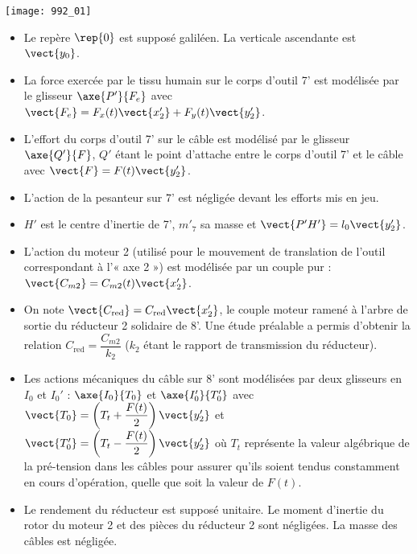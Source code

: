 \begin{center}
\texttt{[image: 992\_01]}
\end{center}

\begin{itemize}
\item Le repère $\rep{0}$ est supposé galiléen. La verticale ascendante est $\vect{y_0}$.
\item La force exercée par le tissu humain sur le corps d’outil 7’ est modélisée par le glisseur $\axe{P'}{F_e}$
avec $\vect{F_e}=F_x(t)\vect{x_2'}+F_y(t)\vect{y_2'}$.
\item L’effort du corps d’outil 7’ sur le câble est modélisé par le glisseur $\axe{Q'}{F}$, $Q'$ étant le point
d’attache entre le corps d’outil 7’ et le câble avec $\vect{F}=F(t)\vect{y_2'}$.
\item L’action de la pesanteur sur 7’ est négligée devant les efforts mis en jeu.
\item $H'$ est le centre d’inertie de 7’, $m'_7$ sa masse et $\vect{P'H'}=l_0\vect{y_2'}$.
\item L’action du moteur 2 (utilisé pour le mouvement de translation de l’outil correspondant à l’« axe 2 ») est
modélisée par un couple pur : $\vect{C_{m2}}=C_{m2}(t)\vect{x_2'}$.
\item On note  $\vect{C_{\text{red}}}=C_{\text{red}}\vect{x_2'}$, le couple moteur ramené à l’arbre de sortie du réducteur 2 solidaire de 8’. Une étude préalable a permis d’obtenir la relation
$C_{\text{red}}=\dfrac{C_{m2}}{k_2}$ ($k_2$ étant le rapport de transmission du réducteur).
\item Les actions mécaniques du câble sur 8’ sont modélisées par deux glisseurs en $I_0$ et $I_0'$ : 
$\axe{I_0}{T_0}$  et $\axe{I_0'}{T_0'}$ avec
$\vect{T_0}=\left( T_t + \dfrac{F(t)}{2}\right)\vect{y_2'}$
et $\vect{T'_0}=\left( T_t - \dfrac{F(t)}{2}\right)\vect{y_2'}$ où
$T_t$ représente la valeur algébrique de la pré-tension dans les câbles pour assurer qu’ils soient tendus constamment en cours d’opération, quelle que soit la valeur de $F(t)$.
\item Le rendement du réducteur est supposé unitaire. Le moment d’inertie du rotor du moteur 2 et des pièces du réducteur 2 sont négligées. La masse des câbles est négligée.
\end{itemize}
